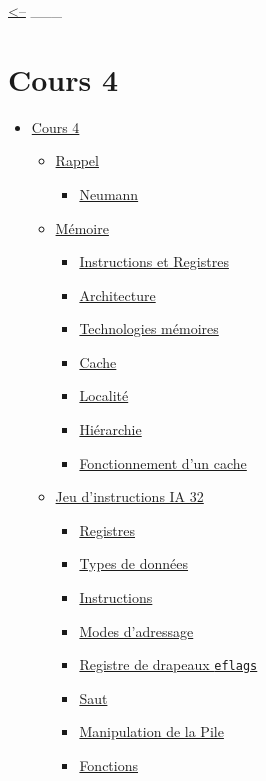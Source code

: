 \href{../README.md}{\textless--} \_\_\_

\section{Cours 4}\label{cours-4}

\begin{itemize}
\tightlist
\item
  \hyperref[cours-4]{Cours 4}

  \begin{itemize}
  \tightlist
  \item
    \hyperref[rappel]{Rappel}

    \begin{itemize}
    \tightlist
    \item
      \hyperref[neumann]{Neumann}
    \end{itemize}
  \item
    \hyperref[muxe9moire]{Mémoire}

    \begin{itemize}
    \tightlist
    \item
      \hyperref[instructions-et-registres]{Instructions et Registres}
    \item
      \hyperref[architecture]{Architecture}
    \item
      \hyperref[technologies-muxe9moires]{Technologies mémoires}
    \item
      \hyperref[cache]{Cache}
    \item
      \hyperref[localituxe9]{Localité}
    \item
      \hyperref[hiuxe9rarchie]{Hiérarchie}
    \item
      \hyperref[fonctionnement-dun-cache]{Fonctionnement d'un cache}
    \end{itemize}
  \item
    \hyperref[jeu-dinstructions-ia-32]{Jeu d'instructions IA 32}

    \begin{itemize}
    \tightlist
    \item
      \hyperref[registres]{Registres}
    \item
      \hyperref[types-de-donnuxe9es]{Types de données}
    \item
      \hyperref[instructions]{Instructions}
    \item
      \hyperref[modes-dadressage]{Modes d'adressage}
    \item
      \hyperref[registre-de-drapeaux-eflags]{Registre de drapeaux
      \texttt{eflags}}
    \item
      \hyperref[saut]{Saut}
    \item
      \hyperref[manipulation-de-la-pile]{Manipulation de la Pile}
    \item
      \hyperref[fonctions]{Fonctions}
    \end{itemize}
  \end{itemize}
\end{itemize}

